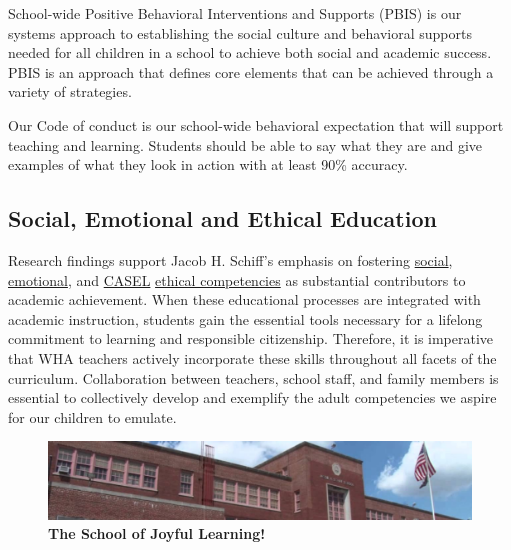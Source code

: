 \documentclass[11pt, letterpaper]{article}
\begin{document}
School-wide Positive Behavioral Interventions and Supports (PBIS) is our systems approach to establishing the social culture and behavioral supports needed for all children in a school to achieve both social and academic success. PBIS is an approach that defines core elements that can be achieved through a variety of strategies.

Our Code of conduct is our school-wide behavioral expectation that will support teaching and learning. Students should be able to say what they are and give examples of what they look in action with at least 90\% accuracy.

\subsection{Social, Emotional and Ethical Education}
Research findings support Jacob H. Schiff's emphasis on fostering \href{https://online.harmonysel.org/}{social}, \href{https://online.harmonysel.org/}{emotional}, and \href{https://casel.s3.us-east-2.amazonaws.com/CASEL-Wheel-SEL-Reflection.pdf}{CASEL} \href{https://casel.s3.us-east-2.amazonaws.com/CASEL-Wheel-SEL-Reflection.pdf}{ethical competencies} as substantial contributors to academic achievement. When these educational processes are integrated with academic instruction, students gain the essential tools necessary for a lifelong commitment to learning and responsible citizenship. Therefore, it is imperative that WHA teachers actively incorporate these skills throughout all facets of the curriculum. Collaboration between teachers, school staff, and family members is essential to collectively develop and exemplify the adult competencies we aspire for our children to emulate.

\begin{figure}[H]
  \centering
\includegraphics[width=1\linewidth]{1.png}
\caption{\textbf{The School of Joyful Learning!}}
  \label{fig:PS192}
\end{figure}
\end{document}
